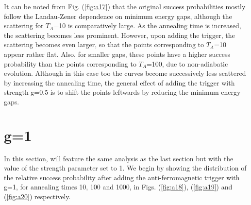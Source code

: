 \documentclass[../main.tex]{subfiles}
\begin{document}
It can be noted from Fig. (\ref{fig:a17}) that the original success probabilities mostly follow the Landau-Zener dependence on minimum energy gaps, although the scattering for $T_A$=10 is comparatively large. As the annealing time is increased, the scattering becomes less prominent. However, upon adding the trigger, the scattering becomes even larger, so that the points corresponding to $T_A$=10 appear rather flat. Also, for smaller gaps, these points have a higher success probability than the points corresponding to $T_A$=100, due to non-adiabatic evolution. Although in this case too the curves become successively less scattered by increasing the annealing time, the general effect of adding the trigger with strength g=0.5 is to shift the points leftwards by reducing the minimum energy gaps.


\section*{g=1}
In this section, will feature the same analysis as the last section but with the value of the strength parameter set to 1. We begin by showing the distribution of the relative success probability after adding the anti-ferromagnetic trigger with g=1, for annealing times 10, 100 and 1000, in Figs. (\ref{fig:a18}), (\ref{fig:a19}) and (\ref{fig:a20}) respectively.
\end{document}
